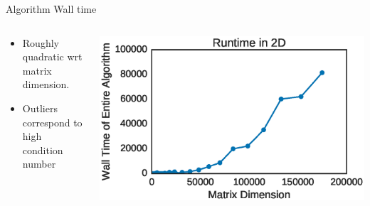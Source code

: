 \documentclass[10pt]{beamer}
\begin{document}
{{{{{{{{{{{{{{{{{{\begin{frame}{Algorithm Wall time}
	\begin{columns}[c] %
		\begin{column}{.4\textwidth}
			\begin{itemize}
				\item {Roughly quadratic wrt matrix dimension.}
				\item {Outliers correspond to high condition number}
			\end{itemize}				
		\end{column}
		\hfill
		\begin{column}{0.6\textwidth}
		    \includegraphics[width=\linewidth]{../images/overallruntime.eps}
		\end{column}	
	\end{columns}
\end{frame}


}}}}}}}}}}}}}}}}}}
\end{document}
